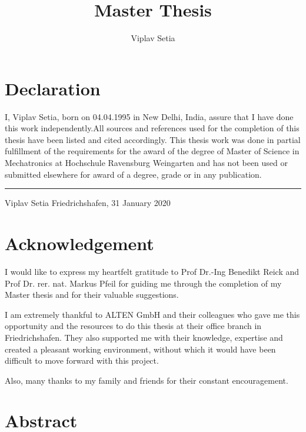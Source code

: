 \documentclass[%
xelatex,
	oneside,		%
	12pt,			%
	parskip=half,	%
	abstracton,
	chapterprefix=true%
    appendixprefix=true]
{scrbook}
\title{Master Thesis}
\author{Viplav Setia}
\begin{document}
\section*{\Large\normalfont\bfseries Declaration}

I, Viplav Setia, born on 04.04.1995 in New Delhi, India, assure that I have done this work independently.All sources and references used for the completion of this
thesis have been listed and cited accordingly. This thesis work was done in
partial fulfillment of the requirements for the award of the degree of Master of
Science in Mechatronics at Hochschule Ravensburg Weingarten and has not been
used or submitted elsewhere for award of a degree, grade or in any publication. \newline


\rule{5cm}{.4pt}

Viplav Setia \newline
Friedrichshafen, 31 January 2020
\clearpage

		\section*{\Large\normalfont\bfseries Acknowledgement}

I would like to express my heartfelt
gratitude to Prof Dr.-Ing Benedikt Reick and Prof Dr. rer. nat. Markus Pfeil for guiding me through the completion of my Master thesis and for their valuable
suggestions.

I am extremely thankful to ALTEN GmbH and their colleagues who gave me this opportunity and the resources to do this thesis at their office branch in Friedrichshafen. They also supported me with their knowledge,  expertise and created a pleasant working environment, without which it would have been difficult to move forward with this project.

Also, many thanks to my family and friends for their constant encouragement.				
	\clearpage
		\section*{\Large\normalfont\bfseries Abstract}
\end{document}
